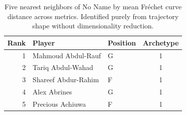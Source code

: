 \begin{table}[htbp]
  \centering\small
  \begin{tabular}{rllc}
    \toprule
    Rank & Player & Position & Archetype \\
    \midrule
    1 & Mahmoud Abdul-Rauf & G & 1 \\
    2 & Tariq Abdul-Wahad & G & 1 \\
    3 & Shareef Abdur-Rahim & F & 1 \\
    4 & Alex Abrines & G & 1 \\
    5 & Precious Achiuwa & F & 1 \\
    \bottomrule
  \end{tabular}
  \caption{Five nearest neighbors of No Name by mean Fr\'{e}chet curve distance across metrics. Identified purely from trajectory shape without dimensionality reduction.}
\end{table}

